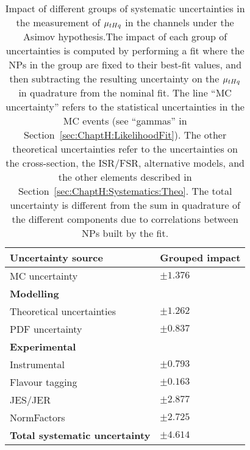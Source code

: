 \begin{table}[h] %
\centering
\begin{tabular}{l|l}
\toprule
\textbf{Uncertainty source}	& Grouped impact	\\
\midrule
MC uncertainty				& $\pm 1.376$		\\
\midrule
\textbf{Modelling}			&            			\\
Theoretical uncertainties			& $\pm 1.262$	\\
PDF uncertainty			& $\pm 0.837$\\ 
\midrule
\textbf{Experimental}			&				\\
Instrumental				& $\pm 0.793$	\\
Flavour tagging				& $\pm 0.163$	\\
JES/JER					& $\pm 2.877$	\\
\midrule
NormFactors				& $\pm 2.725$	\\
\midrule
\textbf{Total systematic uncertainty} & $\pm 4.614$\\
\bottomrule   
\end{tabular}
\caption{Impact of different groups of systematic uncertainties in the measurement of $\mu_{tHq}$ in 
the \dilepSStau channels under the Asimov hypothesis.The impact of each group of uncertainties is computed 
by performing a fit where the NPs in the group are fixed to their best-fit values, and then subtracting the resulting 
uncertainty on the $\mu_{tHq}$ in quadrature from the nominal fit. The line ``MC uncertainty'' refers to the statistical 
uncertainties in the MC events (see ``gammas'' in Section~\ref{sec:ChaptH:LikelihoodFit}).
The other theoretical uncertainties refer to the uncertainties on the cross-section, the ISR/FSR, alternative models, and
the other elements described in Section~\ref{sec:ChaptH:Systematics:Theo}.
The total uncertainty is different from the sum in quadrature of the different components due to correlations between
NPs built by the fit.}
\label{tab:ChaptH:Asimov:SS:GroupedSyst}
\end{table}

